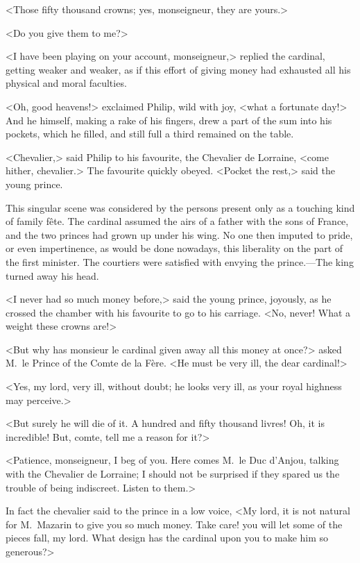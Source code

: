 <Those fifty thousand crowns; yes, monseigneur, they are yours.>

<Do you give them to me?>

<I have been playing on your account, monseigneur,> replied the cardinal, getting weaker and weaker, as if this effort of giving money had exhausted all his physical and moral faculties.

<Oh, good heavens!> exclaimed Philip, wild with joy, <what a fortunate day!> And he himself, making a rake of his fingers, drew a part of the sum into his pockets, which he filled, and still full a third remained on the table.

<Chevalier,> said Philip to his favourite, the Chevalier de Lorraine, <come hither, chevalier.> The favourite quickly obeyed. <Pocket the rest,> said the young prince.

This singular scene was considered by the persons present only as a touching kind of family fête. The cardinal assumed the airs of a father with the sons of France, and the two princes had grown up under his wing. No one then imputed to pride, or even impertinence, as would be done nowadays, this liberality on the part of the first minister. The courtiers were satisfied with envying the prince.—The king turned away his head.

<I never had so much money before,> said the young prince, joyously, as he crossed the chamber with his favourite to go to his carriage. <No, never! What a weight these crowns are!>

<But why has monsieur le cardinal given away all this money at once?> asked M.~le Prince of the Comte de la Fère. <He must be very ill, the dear cardinal!>

<Yes, my lord, very ill, without doubt; he looks very ill, as your royal highness may perceive.>

<But surely he will die of it. A hundred and fifty thousand livres! Oh, it is incredible! But, comte, tell me a reason for it?>

<Patience, monseigneur, I beg of you. Here comes M.~le Duc d'Anjou, talking with the Chevalier de Lorraine; I should not be surprised if they spared us the trouble of being indiscreet. Listen to them.>

In fact the chevalier said to the prince in a low voice, <My lord, it is not natural for M.~Mazarin to give you so much money. Take care! you will let some of the pieces fall, my lord. What design has the cardinal upon you to make him so generous?>

